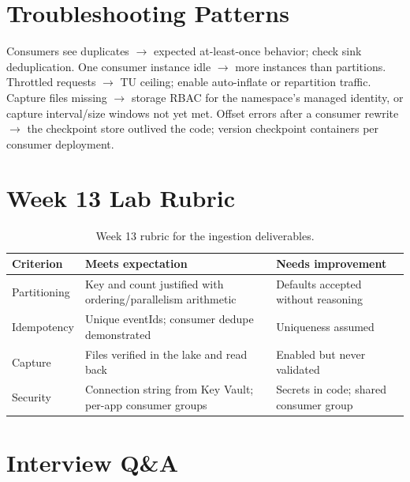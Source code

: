 \section{Troubleshooting Patterns}
Consumers see duplicates $\rightarrow$ expected at-least-once behavior; check sink deduplication. One consumer instance idle $\rightarrow$ more instances than partitions. Throttled requests $\rightarrow$ TU ceiling; enable auto-inflate or repartition traffic. Capture files missing $\rightarrow$ storage RBAC for the namespace's managed identity, or capture interval/size windows not yet met. Offset errors after a consumer rewrite $\rightarrow$ the checkpoint store outlived the code; version checkpoint containers per consumer deployment.

\section{Week 13 Lab Rubric}
\begin{table}[H]
\centering
\small
\begin{tabular}{@{}p{3.2cm}p{5.0cm}p{5.0cm}@{}}
\toprule
\textbf{Criterion} & \textbf{Meets expectation} & \textbf{Needs improvement} \\
\midrule
Partitioning & Key and count justified with ordering/parallelism arithmetic & Defaults accepted without reasoning \\
Idempotency & Unique eventIds; consumer dedupe demonstrated & Uniqueness assumed \\
Capture & Files verified in the lake and read back & Enabled but never validated \\
Security & Connection string from Key Vault; per-app consumer groups & Secrets in code; shared consumer group \\
\bottomrule
\end{tabular}
\caption{Week 13 rubric for the ingestion deliverables.}
\label{tab:ch13-rubric}
\end{table}

\section{Interview Q\&A}
